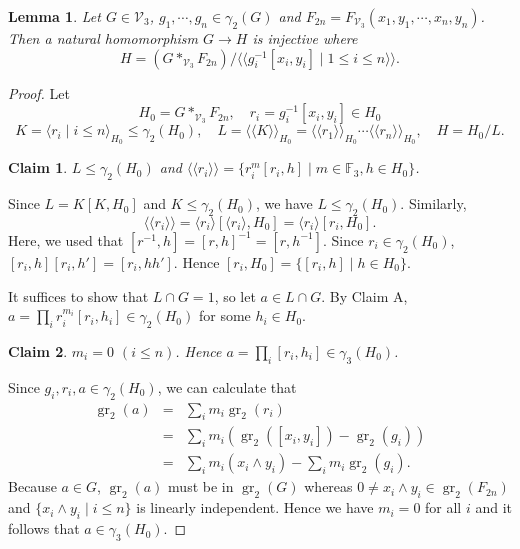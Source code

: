 \documentclass[11pt,reqno]{article}
\newtheorem{lemma}[theorem]{Lemma}
\newtheorem{claim}{Claim}[theorem]
\theoremstyle{definition}
\theoremstyle{remark}
\DeclareMathOperator{\gr}{gr}
\newcommand{\llangle}{\langle\!\langle}
\newcommand{\rrangle}{\rangle\!\rangle}
\begin{document}
\begin{lemma}\label{lemma:basic commutator root}
    Let $G\in \mathcal V_3$, $g_1,\cdots, g_n \in \gamma_2(G)$ and $F_{2n}=F_{\mathcal V_3}(x_1,y_1,\cdots, x_n,y_n)$.
    Then a natural homomorphism $G\to H$ is injective where 
    $$
        H=(G*_{\mathcal V_3}F_{2n})/
        \llangle g_i^{-1}[x_i,y_i]\mid 1\leq i\leq n\rrangle.
    $$
\end{lemma}

\begin{proof}
    Let 
    \[ 
        H_0=G*_{\mathcal V_3}F_{2n},\quad 
        r_i = g_i^{-1}[x_i,y_i] \in H_0
         \] 
    \[ 
        K=\langle r_i\mid i\leq n\rangle_{H_0}\leq \gamma_2(H_0), \quad
        L=\llangle K\rrangle_{H_0}=\llangle r_1\rrangle_{H_0}\cdots\llangle r_n\rrangle_{H_0}, \quad H= H_0/L.
    \]  

    \begin{claim}
        $L\leq \gamma_2(H_0)$ and $\llangle r_i\rrangle = \{r_i^m[r_i,h]\mid m\in \mathbb F_3, h\in H_0\}$.
    \end{claim}
    Since $L=K[K,H_0]$ and $K\leq \gamma_2(H_0)$, we have $L\leq \gamma_2(H_0)$.
    Similarly,
    \[
        \llangle r_i\rrangle
        =\langle r_i\rangle [\langle r_i\rangle,H_0]
        =\langle r_i\rangle [r_i,H_0].
    \]
    Here, we used that $[r^{-1},h]=[r,h]^{-1}=[r,h^{-1}]$.
    Since $r_i\in\gamma_2(H_0)$, $[r_i,h][r_i,h']=[r_i,hh']$.
    Hence $[r_i,H_0]=\{[r_i,h]\mid h\in H_0\}$.

    It suffices to show that $L\cap G=1$, so let $a\in L\cap G$.
    By Claim A, $a=\prod_i r_i^{m_i}[r_i,h_i]\in\gamma_2(H_0)$ for some $h_i\in H_0$.

    \begin{claim}
    $m_i=0$ $(i\leq n)$. Hence $a=\prod_i[r_i,h_i] \in\gamma_3(H_0)$.
    \end{claim}
    Since $g_i,r_i,a\in \gamma_2(H_0)$, we can calculate that
    \begin{eqnarray*}
    \gr_2(a)&=&\sum_i m_i\gr_2(r_i)\\ 
    &=&\sum_i m_i(\gr_2([x_i,y_i])-\gr_2(g_i))\\ 
    &=& \sum_i m_i(x_i\wedge y_i) - \sum_i m_i\gr_2(g_i).
    \end{eqnarray*}
    Because $a\in G$, $\gr_2(a)$ must be in $\gr_2(G)$ whereas $0\neq x_i\wedge y_i\in \gr_2(F_{2n})$ and $\{x_i\wedge y_i\mid i\leq n\}$ is linearly independent.
    Hence we have $m_i=0$ for all $i$ and it follows that $a\in\gamma_3(H_0)$.


\end{proof}
\end{document}

